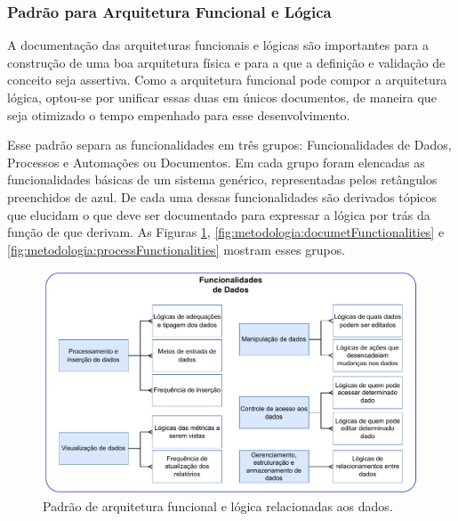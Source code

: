 	\subsubsection{Padrão para Arquitetura Funcional e Lógica}

	A documentação das arquiteturas funcionais e lógicas são importantes para a construção de uma boa arquitetura física e para a que a definição e validação de conceito seja assertiva. Como a 
	arquitetura funcional pode compor a arquitetura lógica, optou-se por unificar essas duas em únicos documentos, de maneira que seja otimizado o tempo empenhado para esse desenvolvimento.
	
	Esse padrão separa as funcionalidades em três grupos: Funcionalidades de Dados, Processos e Automações ou Documentos. Em cada grupo foram elencadas as funcionalidades básicas de um sistema genérico,
	representadas pelos retângulos preenchidos de azul. De cada uma dessas funcionalidades são derivados tópicos que elucidam o que deve ser documentado para expressar a lógica por trás
	da função de que derivam. As Figuras \ref{fig:metodologia:dataFunctionalities}, \ref{fig:metodologia:documetFunctionalities} e \ref{fig:metodologia:processFunctionalities} mostram esses grupos.

	\begin{figure}[!htb]
		\centering
		\includegraphics[width=1\textwidth]{./figuras/dataFunctionalities.pdf}
		\caption{Padrão de arquitetura funcional e lógica relacionadas aos dados.}
		\label{fig:metodologia:dataFunctionalities}
	\end{figure}

